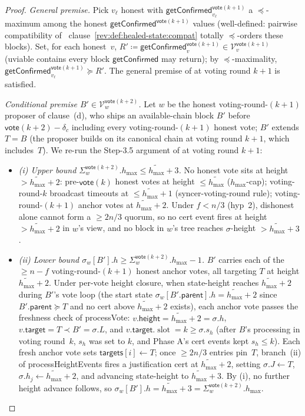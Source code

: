 \ifx\litemode\undefined\documentclass{article}\fi
\newcommand{\V}[0]{\ensuremath{\mathcal{V}}}
\newcommand{\slot}[0]{\ensuremath{\operatorname{\mathrm{slot}}}}
\newcommand{\target}{\mathsf{target}}
\newcommand{\height}{\mathsf{height}}
\newcommand{\parent}{\mathsf{parent}}
\newcommand{\targets}{\mathsf{targets}}
\newcommand{\hmax}{\ensuremath{h_{\max}}\xspace}
\newcommand{\processHeightEvents}{\textsf{processHeightEvents}\xspace}
\newcommand{\processVote}{\textsf{processVote}\xspace}
\newcommand{\vote}{\ensuremath{\mathsf{vote}}}
\newcommand{\comm}[1]{\ensuremath{\widetilde{#1}}}
\newcommand{\getConfirmed}{\textsf{getConfirmed}\xspace}
\theoremstyle{plain}
\theoremstyle{definition}
\theoremstyle{remark}
\begin{document}
\begin{proof}
\emph{General premise.}
Pick $v_\ell$ honest with $\getConfirmed_{v_\ell}^{\vote(k+1)}$ a $\preceq$-maximum among the honest $\getConfirmed^{\vote(k+1)}$ values (well-defined: pairwise compatibility of ~clause~\ref{rev:def:healed-state:compat} totally $\preceq$-orders these blocks). Set, for each honest~$v$, $R' \coloneqq \getConfirmed_v^{\vote(k+1)} \in \V_v^{\vote(k+1)}$ (uviable contains every block $\getConfirmed$ may return); by $\preceq$-maximality, $\getConfirmed_{v_\ell}^{\vote(k+1)} \succeq R'$. The general premise of  at voting round $k+1$ is satisfied.

\emph{Conditional premise $B' \in \V_w^{\vote(k+2)}$.}
Let $w$ be the honest voting-round-$(k+1)$ proposer of clause~(d), who ships an available-chain block $B'$ before $\vote(k+2) - \delta_c$ including every voting-round-$(k+1)$ honest vote; $B'$ extends $T = B$ (the proposer builds on its canonical chain at voting round $k+1$, which includes~$T$). We re-run the Step-3.5 argument of  at voting round $k+1$:
\begin{itemize}
  \item \emph{(i) Upper bound $\Sigma_w^{\vote(k+2)}.\hmax \leq \comm{\hmax}+3$.}
    No honest vote sits at height $> \comm{\hmax}+2$: pre-$\vote(k)$ honest votes at height $\leq \comm{\hmax}$ ($\hmax$-cap); voting-round-$k$ broadcast timeouts at $\leq \comm{\hmax}+1$ (syncer-voting-round rule); voting-round-$(k+1)$ anchor votes at $\comm{\hmax}+2$. Under $f<n/3$ (hyp~2), dishonest alone cannot form a $\geq 2n/3$ quorum, so no cert event fires at height $> \comm{\hmax}+2$ in $w$'s view, and no block in $w$'s tree reaches $\sigma$-height $> \comm{\hmax}+3$.
  \item \emph{(ii) Lower bound $\sigma_w[B'].h \geq \Sigma_w^{\vote(k+2)}.\hmax - 1$.}
    $B'$ carries each of the $\geq n - f$ voting-round-$(k+1)$ honest anchor votes, all targeting $T$ at height $\comm{\hmax}+2$. Under per-vote height closure, when state-height reaches $\comm{\hmax}+2$ during $B'$'s vote loop (the start state $\sigma_w[B'.\parent].h = \comm{\hmax}+2$ since $B'.\parent \succeq T$ and no cert above $\comm{\hmax}+2$ exists), each anchor vote passes the freshness check of \processVote{}: $v.\height = \comm{\hmax}+2 = \sigma.h$, $v.\target = T \prec B' = \sigma.L$, and $v.\target.\slot = k \geq \sigma.s_h$ (after $B$'s processing in voting round~$k$, $s_h$ was set to $k$, and Phase A's cert events kept $s_h \leq k$). Each fresh anchor vote sets $\targets[i] \gets T$; once $\geq 2n/3$ entries pin~$T$, branch~(ii) of \processHeightEvents{} fires a justification cert at $\comm{\hmax}+2$, setting $\sigma.J \gets T$, $\sigma.h_j \gets \comm{\hmax}+2$, and advancing state-height to $\comm{\hmax}+3$. By (i), no further height advance follows, so $\sigma_w[B'].h = \comm{\hmax}+3 = \Sigma_w^{\vote(k+2)}.\hmax$.

\end{itemize}
\end{proof}
\end{document}
